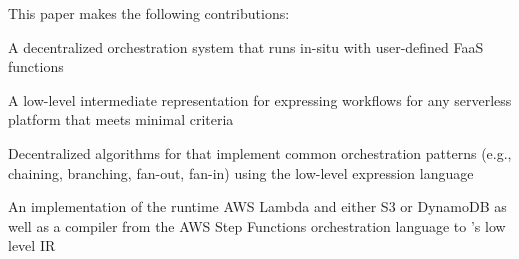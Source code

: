 This paper makes the following contributions:

\squishlist

  \item A decentralized orchestration system that runs in-situ with user-defined FaaS functions

  \item A low-level intermediate representation for expressing workflows for any
serverless platform that meets minimal criteria

  \item Decentralized algorithms for that implement common orchestration
patterns (e.g., chaining, branching, fan-out, fan-in) using the low-level
expression language

  \item An implementation of the \name{} runtime AWS Lambda and either S3 or
DynamoDB as well as a compiler from the AWS Step Functions orchestration
language to \name{}'s low level IR

\squishend

